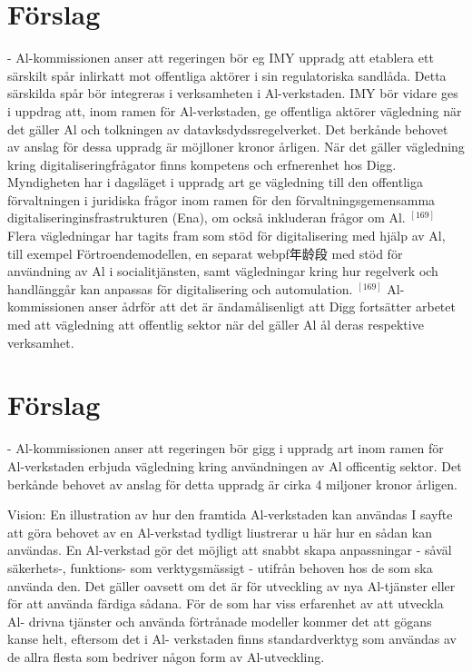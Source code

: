 {{{{{{{{{{{{{{{{\section*{Förslag}
- Al-kommissionen anser att regeringen bör eg IMY uppradg att etablera ett särskilt spår inlirkatt mot offentliga aktörer i sin regulatoriska sandlåda. Detta särskilda spår bör integreras i verksamheten i Al-verkstaden. IMY bör vidare ges i uppdrag att, inom ramen för Al-verkstaden, ge offentliga aktörer vägledning när det gäller Al och tolkningen av datavksdydssregelverket. Det berkånde behovet av anslag för dessa uppradg är möjlloner kronor årligen.
När det gäller vägledning kring digitaliseringfrågator finns kompetens och erfnerenhet hos Digg. Myndigheten har i dagsläget i uppradg art ge vägledning till den offentliga förvaltningen i juridiska frågor inom ramen för den förvaltningsgemensamma digitaliseringinsfrastrukturen (Ena), om också inkluderan frågor om Al. \({ }^{[169]}\) Flera vägledningar har tagits fram som stöd för digitalisering med hjälp av Al, till exempel Förtroendemodellen, en separat webpf年龄段 med stöd för användning av Al i socialitjänsten, samt vägledningar kring hur regelverk och handlänggår kan anpassas för digitalisering och automulation. \({ }^{[169]}\) Al-kommissionen anser ådrför att det är ändamålisenligt att Digg fortsätter arbetet med att vägledning att offentlig sektor när del gäller Al ål deras respektive verksamhet.
\section*{Förslag}
- Al-kommissionen anser att regeringen bör gigg i uppradg art inom ramen för Al-verkstaden erbjuda vägledning kring användningen av Al officentig sektor. Det berkånde behovet av anslag för detta uppradg är cirka 4 miljoner kronor årligen.

Vision: En illustration av hur den framtida Al-verkstaden kan användas
I sayfte att göra behovet av en Al-verkstad tydligt
liustrerar u här hur en sådan kan användas.
En Al-verkstad gör det möjligt att snabbt skapa
anpassningar - såväl säkerhets-, funktions- som
verktygsmässigt - utifrån behoven hos de som
ska använda den. Det gäller oavsett om det är för
utveckling av nya Al-tjänster eller för att använda
färdiga sådana.
För de som har viss erfarenhet av att utveckla Al-
drivna tjänster och använda förtrånade modeller
kommer det att gögans kanse helt, eftersom det i Al-
verkstaden finns standardverktyg som användas av de
allra flesta som bedriver någon form av Al-utveckling.
}}}}}}}}}}}}}}}}
